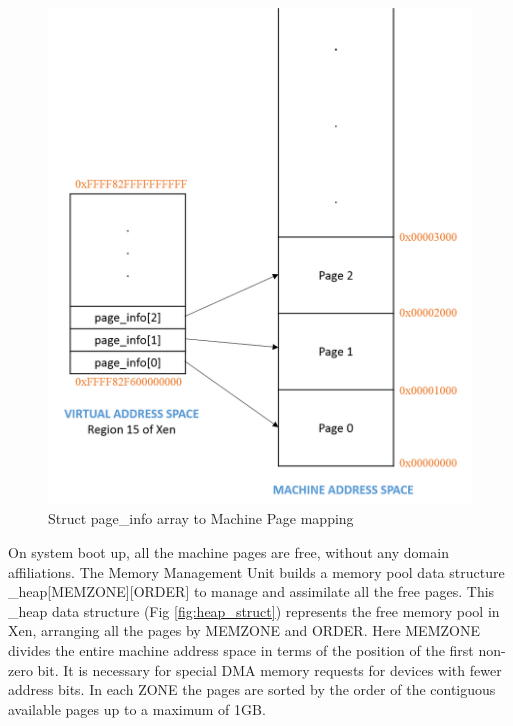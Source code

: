 \begin{figure}[H]
\centering
\includegraphics[scale=0.8]{figures/page_info.png}
\caption[Struct page\_info array to Machine Page mapping]{Struct page\_info array to Machine Page mapping \cite{xen_code}}
\label{fig:page_info_mapping}
\end{figure}

On system boot up, all the machine pages are free, without any domain affiliations. The Memory Management Unit builds a memory pool data structure \_heap[MEMZONE][ORDER] to manage and assimilate all the free pages. This \_heap data structure (Fig \ref{fig:heap_struct}) represents the free memory pool in Xen, arranging all the pages by MEMZONE and ORDER. Here MEMZONE divides the entire machine address space in terms of the position of the first non-zero bit. It is necessary for special DMA memory requests for devices with fewer address bits. In each ZONE the pages are sorted by the order of the contiguous available pages up to a maximum of 1GB. 


